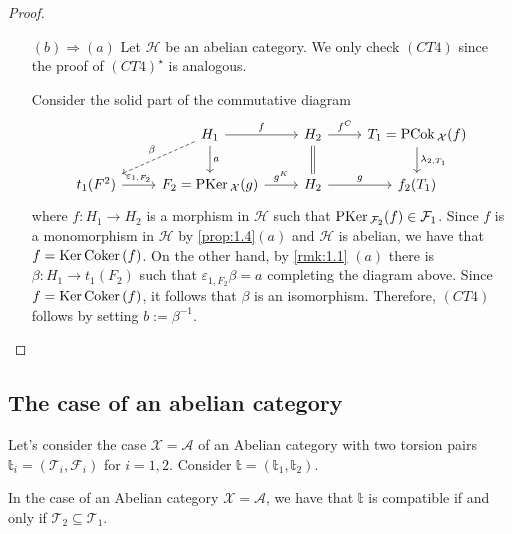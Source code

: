 \begin{proof}
\begin{enumerate}
    \item[$(b)\Rightarrow (a)$] Let $\mathcal{H}$ be an abelian category. We only check $(CT4)$ 
    since the proof of $(CT4)^\star$ is analogous.

    Consider the solid part of the commutative diagram
    \begin{equation*}
      \begin{tikzcd}
        & H_1\arrow{r}{f}\arrow{d}{a}\arrow[dashed]{dl}[']{\beta}
          & H_2\arrow{r}{f^C}\arrow[equal]{d}
            & T_1=\PCok_\mathcal{X}(f)\arrow{d}{\lambda_{2,T_1}}\\
        t_1(F^2)\arrow{r}{\varepsilon_{1,F_2}}
        & F_2=\PKer_\mathcal{X}(g)\arrow{r}{g^K}
          & H_2\arrow{r}{g}
            &f_2(T_1)
      \end{tikzcd}
    \end{equation*}
    where $f:H_1\to H_2$ is a morphism in $\mathcal{H}$ such that $\mathrm{\textup{PKer\,}}_{\mathcal{F}_2}(f)\in\mathcal{F}_1$.
    Since $f$ is a monomorphism in $\mathcal{H}$ by \ref{prop:1.4}$(a)$ 
    and $\mathcal{H}$ is abelian, we have that $f=\mathrm{\textup{Ker\,}} \mathrm{\textup{Coker\,}} (f)$. On the other hand, by
    \ref{rmk:1.1} $(a)$ there is $\beta:H_1\to t_1(F_2)$ such that $\varepsilon_{1,F_2}\beta = a$
    completing the diagram above. Since $f=\mathrm{\textup{Ker\,}} \mathrm{\textup{Coker\,}}(f)$, it follows that $\beta$ is
    an isomorphism. Therefore, $(CT4)$ follows by setting $b:=\beta^{-1}$.
  \end{enumerate}
\end{proof}

\subsection{The case of an abelian category}

Let's consider the case $\mathcal{X}=\mathcal{A}$ of an Abelian category with
two torsion pairs $\mathbb{t}_i=(\mathcal{T}_i,\mathcal{F}_i)$ for $i=1,2$.
Consider $\mathbb{t}=(\mathbb{t}_1,\mathbb{t}_2)$.

\begin{rmk}\label{rmk:2.2}
  In the case of an Abelian category $\mathcal{X}=\mathcal{A}$, we have that
  $\mathbb{t}$ is compatible if and only if $\mathcal{T}_2\subseteq\mathcal{T}_1$.
\end{rmk}

